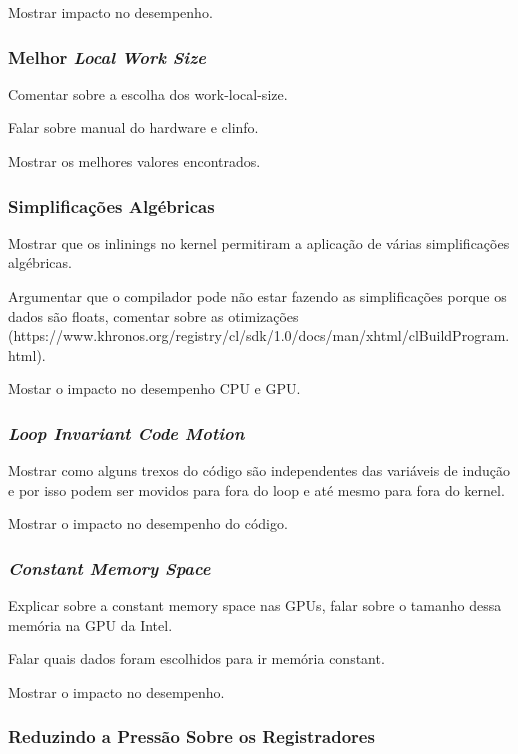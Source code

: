 \documentclass[paper=a4, fontsize=12pt]{scrartcl} %
\numberwithin{equation}{section} %
\numberwithin{figure}{section} %
\numberwithin{table}{section} %
\begin{document}
Mostrar impacto no desempenho.

\subsubsection{Melhor\textit{ Local Work Size}}

Comentar sobre a escolha dos work-local-size.

Falar sobre manual do hardware e clinfo.

Mostrar os melhores valores encontrados.

\subsubsection{Simplificações Algébricas}

Mostrar que os inlinings no kernel permitiram a aplicação de várias simplificações algébricas.

Argumentar que o compilador pode não estar fazendo as simplificações porque os dados são floats, comentar sobre as otimizações (https://www.khronos.org/registry/cl/sdk/1.0/docs/man/xhtml/clBuildProgram.html).

Mostar o impacto no desempenho CPU e GPU.

\subsubsection{\textit{Loop Invariant Code Motion}}

Mostrar como alguns trexos do código são independentes das variáveis de indução e por isso podem ser movidos para fora do loop e até mesmo para fora do kernel.

Mostrar o impacto no desempenho do código.

\subsubsection{\textit{Constant Memory Space}}

Explicar sobre a constant memory space nas GPUs, falar sobre o tamanho dessa memória na GPU da Intel.

Falar quais dados foram escolhidos para ir memória constant.

Mostrar o impacto no desempenho.

\subsubsection{Reduzindo a Pressão Sobre os Registradores }
\end{document}

